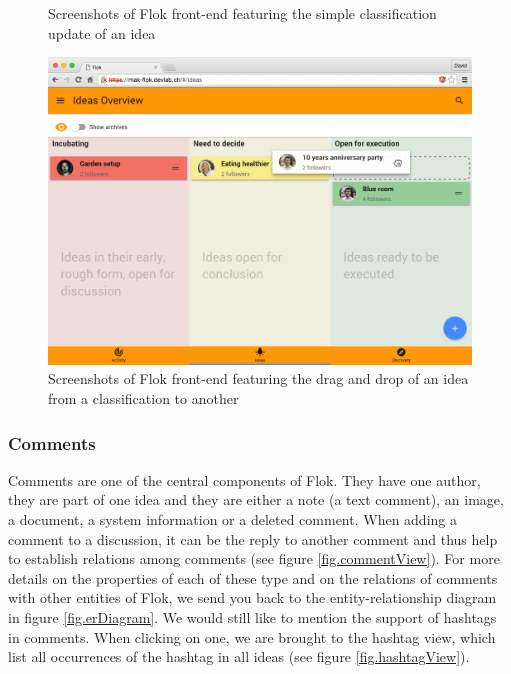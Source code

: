 \documentclass[a4paper,12pt, oneside]{article}
\begin{document}
\begin{figure}[!htb]
\begin{subfigure}{.48\textwidth}
    \end{subfigure}
    \caption{Screenshots of Flok front-end featuring the simple classification update of an idea}
    \label{fig.classificationSelect}
\end{figure}

\begin{figure}[!htb]
    \centering
    \includegraphics[width=\textwidth]{images/classificationDragAndDrop.png}
    \caption{Screenshots of Flok front-end featuring the drag and drop of an idea from a classification to another}
    \label{fig.classificationDragAndDrop}
\end{figure}

\FloatBarrier
\subsubsection{Comments}
\label{sec.comments}
Comments are one of the central components of Flok.
They have one author, they are part of one idea and they are either a note (a text comment), an image, a document, a system information or a deleted comment.
When adding a comment to a discussion, it can be the reply to another comment and thus help to establish relations among comments (see figure \ref{fig.commentView}).
For more details on the properties of each of these type and on the relations of comments with other entities of Flok, we send you back to the entity-relationship diagram in figure \ref{fig.erDiagram}.
We would still like to mention the support of hashtags in comments.
When clicking on one, we are brought to the hashtag view, which list all occurrences of the hashtag in all ideas (see figure \ref{fig.hashtagView}).
\end{document}
